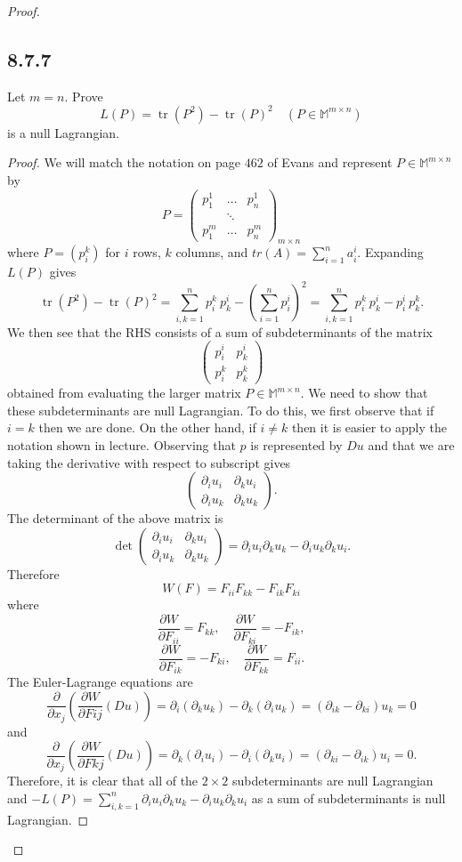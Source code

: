\documentclass{article}
\begin{document}
\begin{flushleft}
\begin{proof}
\subsection{\textbf{8.7.7}} Let $m=n$. Prove 
$$L(P)=\operatorname{tr}(P^2)-\operatorname{tr}(P)^2\quad (P\in\mathbb M^{m\times n})$$
is a null Lagrangian.

\begin{proof} We will match the notation on page $462$ of Evans and represent $P\in\mathbb M^{m\times n}$ by
$$P=
\begin{pmatrix}
p_1^1&\ldots &p_n^1\\
&\ddots&\\
p_1^m&\ldots &p_n^m
\end{pmatrix}_{m\times n}
$$
where $P=(p_i^k)$ for $i$ rows, $k$ columns, and $tr(A)=\sum_{i=1}^n a_i^i$. Expanding $L(P)$ gives
$$\operatorname{tr}(P^2)-\operatorname{tr}(P)^2= \sum_{i,k=1}^n p_i^k ~p_k^i - \left(\sum_{i=1}^n p_i^i\right)^2 = \sum_{i,k=1}^n p_i^k ~p_k^i - p_i^i~ p_k^k.$$
We then see that the RHS consists of a sum of subdeterminants of the matrix
$$\begin{pmatrix}
p_i^i & p_k^i \\
p_i^k & p_k^k
\end{pmatrix}$$
obtained from evaluating the larger matrix $P\in\mathbb M^{m\times n}$. We need to show that these subdeterminants are null Lagrangian. To do this, we first observe that if $i=k$ then we are done. On the other hand, if $i\ne k$ then it is easier to apply the notation shown in lecture. Observing that $p$ is represented by $Du$ and that we are taking the derivative with respect to subscript gives
$$\begin{pmatrix}
\partial_i u_i & \partial_k u_i\\
\partial_i u_k & \partial_k u_k
\end{pmatrix}.$$
The determinant of the above matrix is
$$\det\begin{pmatrix}
\partial_i u_i & \partial_k u_i\\
\partial_i u_k & \partial_k u_k
\end{pmatrix}=\partial_i u_i \partial_k u_k - \partial_i u_k \partial_k u_i.$$
Therefore
$$W(F)=F_{ii}F_{kk}-F_{ik}F_{ki}$$
where
$$\frac{\partial W}{\partial F_{ii}}=F_{kk},\quad \frac{\partial W}{\partial F_{ki}}=-F_{ik},$$
$$\frac{\partial W}{\partial F_{ik}}=-F_{ki},\quad 
\frac{\partial W}{\partial F_{kk}}=F_{ii}.$$
The Euler-Lagrange equations are
$$\frac{\partial }{\partial x_j}\left(\frac{\partial W}{\partial Fij}(Du)\right)=\partial_i(\partial_k u_k) - \partial_k(\partial_i u_k)= (\partial_{ik}-\partial_{ki})u_k=0$$
and
$$\frac{\partial }{\partial x_j}\left(\frac{\partial W}{\partial Fkj}(Du)\right)=\partial_k(\partial_i u_i) - \partial_i(\partial_k u_i)= (\partial_{ki}-\partial_{ik})u_i=0.$$
Therefore, it is clear that all of the $2 \times 2$ subdeterminants are null Lagrangian and  $-L(P)=\sum_{i,k=1}^n \partial_i u_i \partial_k u_k - \partial_i u_k \partial_k u_i$ as a sum of subdeterminants is null Lagrangian.


\end{proof}
\end{proof}
\end{flushleft}
\end{document}

